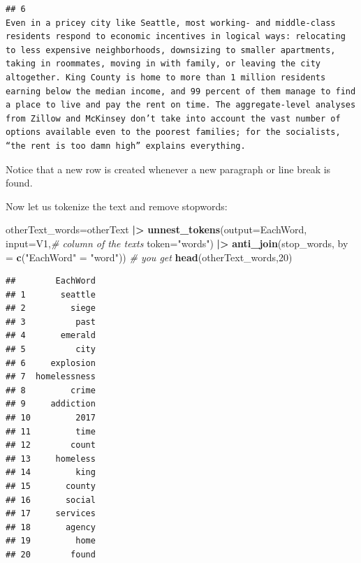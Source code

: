 \documentclass[
]{article}
\newenvironment{Shaded}{\begin{snugshade}}{\end{snugshade}}
\newcommand{\AttributeTok}[1]{\textcolor[rgb]{0.13,0.29,0.53}{#1}}
\newcommand{\CommentTok}[1]{\textcolor[rgb]{0.56,0.35,0.01}{\textit{#1}}}
\newcommand{\DecValTok}[1]{\textcolor[rgb]{0.00,0.00,0.81}{#1}}
\newcommand{\FunctionTok}[1]{\textcolor[rgb]{0.13,0.29,0.53}{\textbf{#1}}}
\newcommand{\NormalTok}[1]{#1}
\newcommand{\OtherTok}[1]{\textcolor[rgb]{0.56,0.35,0.01}{#1}}
\newcommand{\SpecialCharTok}[1]{\textcolor[rgb]{0.81,0.36,0.00}{\textbf{#1}}}
\newcommand{\StringTok}[1]{\textcolor[rgb]{0.31,0.60,0.02}{#1}}
\begin{document}
\begin{verbatim}
## 6                                                                                                                                                                                                                                                                                                                                                                                                                                                                                                                     Even in a pricey city like Seattle, most working- and middle-class residents respond to economic incentives in logical ways: relocating to less expensive neighborhoods, downsizing to smaller apartments, taking in roommates, moving in with family, or leaving the city altogether. King County is home to more than 1 million residents earning below the median income, and 99 percent of them manage to find a place to live and pay the rent on time. The aggregate-level analyses from Zillow and McKinsey don’t take into account the vast number of options available even to the poorest families; for the socialists, “the rent is too damn high” explains everything.
\end{verbatim}

Notice that a new row is created whenever a new paragraph or line break
is found.

Now let us tokenize the text and remove stopwords:

\begin{Shaded}
\begin{Highlighting}[]
\NormalTok{otherText\_words}\OtherTok{=}\NormalTok{otherText }\SpecialCharTok{|\textgreater{}}
               \FunctionTok{unnest\_tokens}\NormalTok{(}\AttributeTok{output=}\NormalTok{EachWord,}
                             \AttributeTok{input=}\NormalTok{V1,}\CommentTok{\# column of the texts}
                             \AttributeTok{token=}\StringTok{"words"}\NormalTok{) }\SpecialCharTok{|\textgreater{}}
               \FunctionTok{anti\_join}\NormalTok{(stop\_words,}
                         \AttributeTok{by =} \FunctionTok{c}\NormalTok{(}\StringTok{"EachWord"} \OtherTok{=} \StringTok{"word"}\NormalTok{))}
\CommentTok{\# you get}
\FunctionTok{head}\NormalTok{(otherText\_words,}\DecValTok{20}\NormalTok{)}
\end{Highlighting}
\end{Shaded}

\begin{verbatim}
##        EachWord
## 1       seattle
## 2         siege
## 3          past
## 4       emerald
## 5          city
## 6     explosion
## 7  homelessness
## 8         crime
## 9     addiction
## 10         2017
## 11         time
## 12        count
## 13     homeless
## 14         king
## 15       county
## 16       social
## 17     services
## 18       agency
## 19         home
## 20        found
\end{verbatim}
\end{document}
